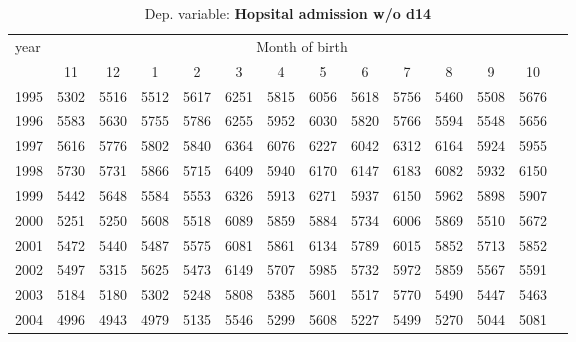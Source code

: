 \begin{table}[H] \begin{threeparttable} \centering \caption{Dep. variable: \textbf{Hopsital admission w/o d14}} {\def\sym#1{\ifmmode^{#1}\else\(^{#1}\)\fi} \begin{tabular}{l*{13}{c}} \toprule year & \multicolumn{12}{c}{Month of birth} \\ \cmidrule(lr){2-13} 
            &          11&          12&           1&           2&           3&           4&           5&           6&           7&           8&           9&          10\\
1995        &        5302&        5516&        5512&        5617&        6251&        5815&        6056&        5618&        5756&        5460&        5508&        5676\\
1996        &        5583&        5630&        5755&        5786&        6255&        5952&        6030&        5820&        5766&        5594&        5548&        5656\\
1997        &        5616&        5776&        5802&        5840&        6364&        6076&        6227&        6042&        6312&        6164&        5924&        5955\\
1998        &        5730&        5731&        5866&        5715&        6409&        5940&        6170&        6147&        6183&        6082&        5932&        6150\\
1999        &        5442&        5648&        5584&        5553&        6326&        5913&        6271&        5937&        6150&        5962&        5898&        5907\\
2000        &        5251&        5250&        5608&        5518&        6089&        5859&        5884&        5734&        6006&        5869&        5510&        5672\\
2001        &        5472&        5440&        5487&        5575&        6081&        5861&        6134&        5789&        6015&        5852&        5713&        5852\\
2002        &        5497&        5315&        5625&        5473&        6149&        5707&        5985&        5732&        5972&        5859&        5567&        5591\\
2003        &        5184&        5180&        5302&        5248&        5808&        5385&        5601&        5517&        5770&        5490&        5447&        5463\\
2004        &        4996&        4943&        4979&        5135&        5546&        5299&        5608&        5227&        5499&        5270&        5044&        5081\\

\end{tabular}}
\end{threeparttable}
\end{table}
